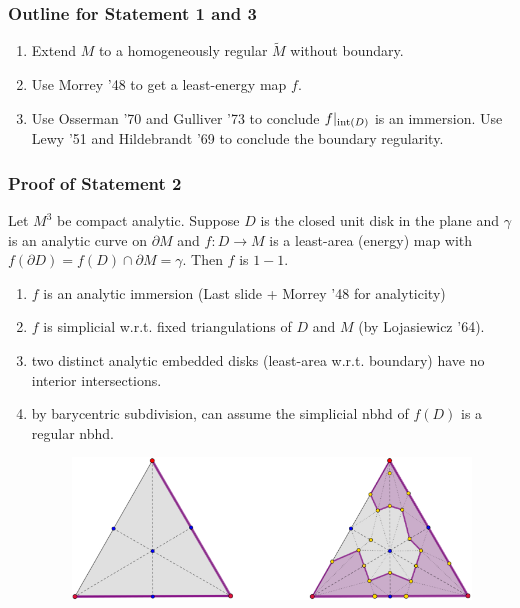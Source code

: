 \documentclass[t]{beamer}
\newcommand{\tn}{\textnormal}
\begin{document}
\begin{frame}
	\frametitle{Outline for Statement 1 and 3}
\begin{enumerate}
	\item Extend $M$ to a homogeneously regular $\widetilde{M}$ without boundary.
	\vspace{2in} 
	\item Use Morrey '48 to get a least-energy map $f$.
	\item Use Osserman '70 and Gulliver '73 to conclude $f|_{\tn{int}(D)}$ is an immersion. Use Lewy '51 and Hildebrandt '69 to conclude the boundary regularity. 
\end{enumerate}
\end{frame}

\begin{frame}
	\frametitle{Proof of Statement 2}
Let $M^3$ be compact analytic. Suppose $D$ is the closed unit disk in the plane and $\gamma$ is an analytic curve on $\partial M$ and $f:D \rightarrow M$ is a least-area (energy) map with $f(\partial D) =f(D)\cap \partial M =\gamma$. Then $f$ is $1-1$. 
\vspace{0.1in}
\begin{enumerate}
	\item $f$ is an analytic immersion (Last slide + Morrey '48 for analyticity)
	\item $f$ is simplicial w.r.t. fixed triangulations of $D$ and $M$ (by Lojasiewicz '64). 
	\item two distinct analytic embedded disks (least-area w.r.t. boundary) have no interior intersections. 
	\vspace{0.5in}
	\item by barycentric subdivision, can assume the simplicial nbhd of $f(D)$ is a regular nbhd. 
	\begin{figure}
		\includegraphics[scale=0.16]{BarycentricRegularNbhd}
	\end{figure}
\end{enumerate}

\end{frame}
\end{document}

